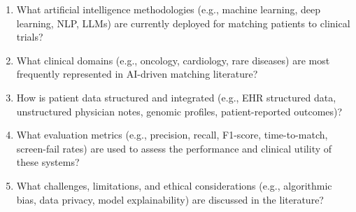 \begin{tcolorbox}[protocolbox, title={Box 1: Primary Research Questions}, label=box:research_questions]
\begin{enumerate}[label=\textbf{RQ\arabic*}:, leftmargin=3.5em, itemsep=4pt, parsep=0pt, topsep=4pt, partopsep=0pt]
  \item What artificial intelligence methodologies (e.g., machine learning, deep learning, NLP, LLMs) are currently deployed for matching patients to clinical trials?
  \item What clinical domains (e.g., oncology, cardiology, rare diseases) are most frequently represented in AI-driven matching literature?
  \item How is patient data structured and integrated (e.g., EHR structured data, unstructured physician notes, genomic profiles, patient-reported outcomes)?
  \item What evaluation metrics (e.g., precision, recall, F1-score, time-to-match, screen-fail rates) are used to assess the performance and clinical utility of these systems?
  \item What challenges, limitations, and ethical considerations (e.g., algorithmic bias, data privacy, model explainability) are discussed in the literature?
\end{enumerate}
\end{tcolorbox}
